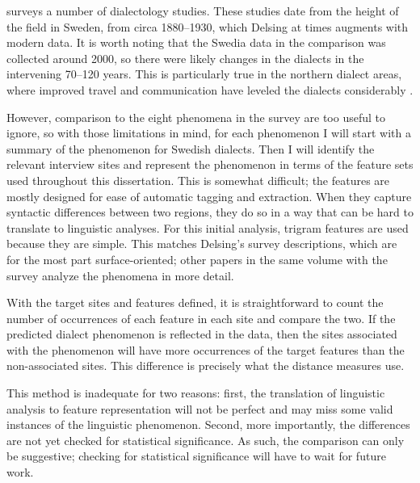  surveys a number of dialectology studies. These
studies date from the height of the field in Sweden, from circa
1880--1930, which Delsing at times augments with modern data. It is
worth noting that the Swedia data in the comparison was collected
around 2000, so there were likely changes in the dialects in the
intervening 70--120 years. This is particularly true in the northern
dialect areas, where improved travel and communication have
leveled the dialects considerably \cite{hallberg05}.

However, comparison to the eight phenomena in the survey are too
useful to ignore, so with those limitations in mind, for each
phenomenon I will start with a summary of the phenomenon for Swedish
dialects. Then I will identify the relevant interview sites and
represent the phenomenon in terms of the feature sets used throughout
this dissertation. This is somewhat difficult; the features are mostly
designed for ease of automatic tagging and extraction. When they
capture syntactic differences between two regions, they do so in a way
that can be hard to translate to linguistic analyses. For this initial
analysis, trigram features are used because they are simple. This
matches Delsing's survey descriptions, which are for the most part
surface-oriented; other papers in the same volume with the survey
analyze the phenomena in more detail.

With the target sites and features defined, it is straightforward to count the
number of occurrences of each feature in each site and compare the
two. If the predicted dialect phenomenon is reflected in the data,
then the sites associated with the phenomenon will have more
occurrences of the target features than the non-associated sites. This
difference is precisely what the distance measures use.

This method is inadequate for two reasons: first, the translation of
linguistic analysis to feature representation will not be perfect and
may miss some valid instances of the linguistic phenomenon. Second,
more importantly, the differences are not yet checked for statistical
significance. As such, the comparison can only be suggestive;
checking for statistical significance will have to wait for future
work.


